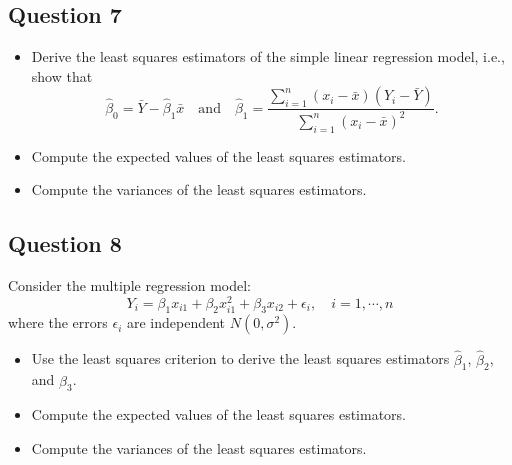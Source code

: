 \clearpage

\subsection{Question 7}

\begin{itemize}
\item[(a)] Derive the least squares estimators of the simple linear regression model, i.e., show that
\[
\hat{\beta}_0 = \bar{Y} - \hat{\beta}_1 \bar{x}
\quad \text{and} \quad
\hat{\beta}_1 = \frac{\sum_{i=1}^{n} (x_i - \bar{x})(Y_i - \bar{Y})}{\sum_{i=1}^{n} (x_i - \bar{x})^2}.
\]

\item[(b)] Compute the expected values of the least squares estimators.

\item[(c)] Compute the variances of the least squares estimators.
\end{itemize}

\clearpage

\subsection{Question 8}

Consider the multiple regression model:
\[
Y_i = \beta_1 x_{i1} + \beta_2 x_{i1}^2 + \beta_3 x_{i2} + \epsilon_i, \quad i = 1, \cdots, n
\]
where the errors $\epsilon_i$ are independent $N(0, \sigma^2)$.

\begin{itemize}
\item[(a)] Use the least squares criterion to derive the least squares estimators $\hat{\beta}_1$, $\hat{\beta}_2$, and $\hat{\beta}_3$.

\item[(b)] Compute the expected values of the least squares estimators.

\item[(c)] Compute the variances of the least squares estimators.
\end{itemize}

\clearpage

